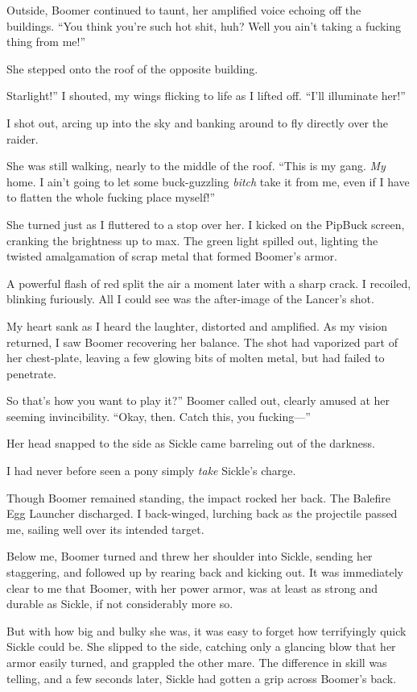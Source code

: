 Outside, Boomer continued to taunt, her amplified voice echoing off the buildings. “You think you’re such hot shit, huh? Well you ain’t taking a fucking thing from me!”

She stepped onto the roof of the opposite building.

\leavevmode{}Starlight!” I shouted, my wings flicking to life as I lifted off. “I’ll illuminate her!”

I shot out, arcing up into the sky and banking around to fly directly over the raider.

She was still walking, nearly to the middle of the roof. “This is my gang. \textit{My} home. I ain’t going to let some buck-guzzling \textit{bitch} take it from me, even if I have to flatten the whole fucking place myself!”

She turned just as I fluttered to a stop over her. I kicked on the PipBuck screen, cranking the brightness up to max. The green light spilled out, lighting the twisted amalgamation of scrap metal that formed Boomer’s armor.

A powerful flash of red split the air a moment later with a sharp crack. I recoiled, blinking furiously. All I could see was the after-image of the Lancer’s shot.

My heart sank as I heard the laughter, distorted and amplified. As my vision returned, I saw Boomer recovering her balance. The shot had vaporized part of her chest-plate, leaving a few glowing bits of molten metal, but had failed to penetrate.

\leavevmode{}So that’s how you want to play it?” Boomer called out, clearly amused at her seeming invincibility. “Okay, then. Catch this, you fucking—”

Her head snapped to the side as Sickle came barreling out of the darkness.

I had never before seen a pony simply \textit{take} Sickle’s charge.

Though Boomer remained standing, the impact rocked her back. The Balefire Egg Launcher discharged. I back-winged, lurching back as the projectile passed me, sailing well over its intended target.

Below me, Boomer turned and threw her shoulder into Sickle, sending her staggering, and followed up by rearing back and kicking out. It was immediately clear to me that Boomer, with her power armor, was at least as strong and durable as Sickle, if not considerably more so.

But with how big and bulky she was, it was easy to forget how terrifyingly quick Sickle could be. She slipped to the side, catching only a glancing blow that her armor easily turned, and grappled the other mare. The difference in skill was telling, and a few seconds later, Sickle had gotten a grip across Boomer’s back.

